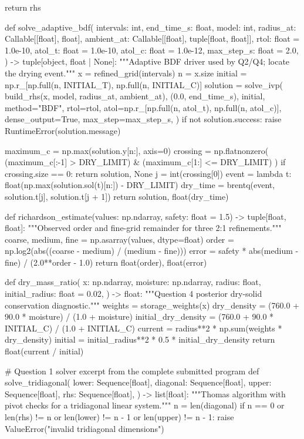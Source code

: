 \documentclass[withoutpreface,bwprint]{cumcmthesis}
\begin{document}
\begin{PythonCode}
    return rhs


def solve_adaptive_bdf(
    intervals: int,
    end_time_s: float,
    model: int,
    radius_at: Callable[[float], float],
    ambient_at: Callable[[float], tuple[float, float]],
    rtol: float = 1.0e-10,
    atol_t: float = 1.0e-10,
    atol_c: float = 1.0e-12,
    max_step_s: float = 2.0,
) -> tuple[object, float | None]:
    """Adaptive BDF driver used by Q2/Q4; locate the drying event."""
    x = refined_grid(intervals)
    n = x.size
    initial = np.r_[np.full(n, INITIAL_T), np.full(n, INITIAL_C)]
    solution = solve_ivp(
        build_rhs(x, model, radius_at, ambient_at),
        (0.0, end_time_s),
        initial,
        method="BDF",
        rtol=rtol,
        atol=np.r_[np.full(n, atol_t), np.full(n, atol_c)],
        dense_output=True,
        max_step=max_step_s,
    )
    if not solution.success:
        raise RuntimeError(solution.message)

    maximum_c = np.max(solution.y[n:], axis=0)
    crossing = np.flatnonzero(
        (maximum_c[:-1] > DRY_LIMIT) & (maximum_c[1:] <= DRY_LIMIT)
    )
    if crossing.size == 0:
        return solution, None
    j = int(crossing[0])
    event = lambda t: float(np.max(solution.sol(t)[n:]) - DRY_LIMIT)
    dry_time = brentq(event, solution.t[j], solution.t[j + 1])
    return solution, float(dry_time)


def richardson_estimate(values: np.ndarray, safety: float = 1.5) -> tuple[float, float]:
    """Observed order and fine-grid remainder for three 2:1 refinements."""
    coarse, medium, fine = np.asarray(values, dtype=float)
    order = np.log2(abs((coarse - medium) / (medium - fine)))
    error = safety * abs(medium - fine) / (2.0**order - 1.0)
    return float(order), float(error)


def dry_mass_ratio(
    x: np.ndarray,
    moisture: np.ndarray,
    radius: float,
    initial_radius: float = 0.02,
) -> float:
    """Question 4 posterior dry-solid conservation diagnostic."""
    weights = storage_weights(x)
    dry_density = (760.0 + 90.0 * moisture) / (1.0 + moisture)
    initial_dry_density = (760.0 + 90.0 * INITIAL_C) / (1.0 + INITIAL_C)
    current = radius**2 * np.sum(weights * dry_density)
    initial = initial_radius**2 * 0.5 * initial_dry_density
    return float(current / initial)


# Question 1 solver excerpt from the complete submitted program
def solve_tridiagonal(
    lower: Sequence[float],
    diagonal: Sequence[float],
    upper: Sequence[float],
    rhs: Sequence[float],
) -> list[float]:
    """Thomas algorithm with pivot checks for a tridiagonal linear system."""
    n = len(diagonal)
    if n == 0 or len(rhs) != n or len(lower) != n - 1 or len(upper) != n - 1:
        raise ValueError("invalid tridiagonal dimensions")


\end{PythonCode}
\end{document}
